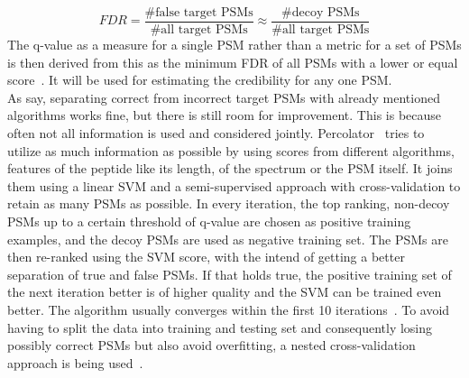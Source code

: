 \documentclass[10pt,a4paper]{article}
\begin{document}
		\begin{equation}
		FDR = \frac{\text{\# false target PSMs}}{\text{\# all target PSMs}} \approx  \frac{\text{\# decoy PSMs}}{\text{\# all target PSMs}}
		\end{equation}
		The q-value as a measure for a single PSM rather than a metric for a set of PSMs is then derived from this as the minimum FDR of all PSMs with a lower or equal score~\cite{Granholm2012, Aggarwal2016}. It will be used for estimating the credibility for any one PSM.\\
		As \citet{Kll2007} say, separating correct from incorrect target PSMs with already mentioned algorithms works fine, but there is still room for improvement. This is because often not all information is used and considered jointly. Percolator~\cite{Kll2007, Granholm2012} tries to utilize as much information as possible by using scores from different algorithms, features of the peptide like its length, of the spectrum or the PSM itself. It joins them using a linear SVM and a semi-supervised approach with cross-validation to retain as many PSMs as possible. In every iteration, the top ranking, non-decoy PSMs up to a certain threshold of q-value are chosen as positive training examples, and the decoy PSMs are used as negative training set. The PSMs are then re-ranked using the SVM score, with the intend of getting a better separation of true and false PSMs. If that holds true, the positive training set of the next iteration better is of higher quality and the SVM can be trained even better. The algorithm usually converges within the first 10 iterations~\cite{Kll2007}. To avoid having to split the data into training and testing set and consequently losing possibly correct PSMs but also avoid overfitting, a nested cross-validation approach is being used~\cite{Granholm2012}.
\end{document}
